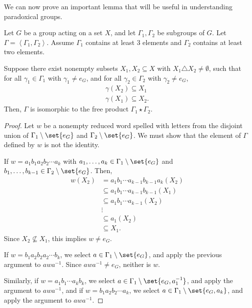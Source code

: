 \documentclass[10pt]{mypackage}
\begin{document}
We can now prove an important lemma that will be useful in understanding paradoxical groups.
\begin{theorem}
  Let $G$ be a group acting on a set $X$, and let $\Gamma_1,\Gamma_2$ be subgroups of $G$. Let $\Gamma = \left\langle \Gamma_1,\Gamma_2 \right\rangle$. Assume $\Gamma_1$ contains at least $3$ elements and $\Gamma_2$ contains at least two elements.\newline

  Suppose there exist nonempty subsets $X_1,X_2\subseteq X$ with $X_1\triangle X_2\neq \emptyset$, such that for all $\gamma_1\in \Gamma_1$ with $\gamma_1\neq e_{G}$, and for all $\gamma_2\in \Gamma_2$ with $\gamma_2\neq e_{G}$,
  \begin{align*}
    \gamma\left(X_2\right)\subseteq X_1\\
    \gamma\left(X_1\right)\subseteq X_2.
  \end{align*}
  Then, $\Gamma$ is isomorphic to the free product $\Gamma_1\star \Gamma_2$.
\end{theorem}
\begin{proof}
  Let $w$ be a nonempty reduced word spelled with letters from the disjoint union of $\Gamma_1\setminus \set{e_G}$ and $\Gamma_2\setminus \set{e_G}$. We must show that the element of $\Gamma$ defined by $w$ is not the identity.\newline

  If $w = a_1b_1a_2b_2\cdots a_k$ with $a_1,\dots,a_k\in \Gamma_1\setminus \set{e_G}$ and $b_1,\dots,b_{k-1}\in \Gamma_2\setminus \set{e_G}$. Then,
  \begin{align*}
    w\left(X_2\right) &= a_1b_1\cdots a_{k-1}b_{k-1}a_k\left(X_2\right)\\
                      &\subseteq a_1b_1\cdots a_{k-1}b_{k-1}\left(X_1\right)\\
                      &\subseteq a_1b_1\cdots a_{k-1}\left(X_2\right)\\
                      &\vdots\\
                      &\subseteq a_1\left(X_2\right)\\
                      &\subseteq X_1.
  \end{align*}
  Since $X_2\nsubseteq X_1$, this implies $w\neq e_{G}$.\newline

  If $w = b_1a_2b_2a_2\cdots b_k$, we select $a\in \Gamma_1\setminus \set{e_G}$, and apply the previous argument to $awa^{-1}$. Since $awa^{-1}\neq e_{G}$, neither is $w$.\newline

  Similarly, if $w = a_1b_1\cdots a_kb_k$, we select $a\in \Gamma_1\setminus \set{e_G,a_1^{-1}}$, and apply the argument to $awa^{-1}$, and if $w = b_1a_2b_2\cdots a_k$, we select $a\in \Gamma_1\setminus \set{e_G,a_k}$, and apply the argument to $awa^{-1}$.
\end{proof}
\end{document}
